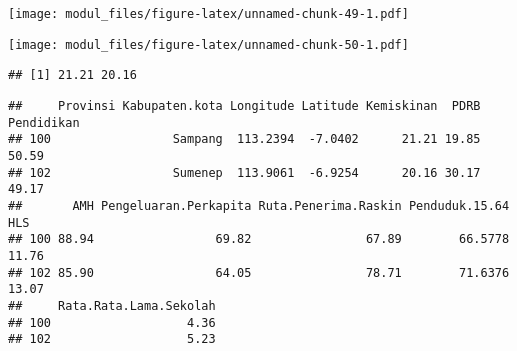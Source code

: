 \documentclass[
]{book}
\newenvironment{Shaded}{\begin{snugshade}}{\end{snugshade}}
\newcommand{\AttributeTok}[1]{\textcolor[rgb]{0.77,0.63,0.00}{#1}}
\newcommand{\DecValTok}[1]{\textcolor[rgb]{0.00,0.00,0.81}{#1}}
\newcommand{\FunctionTok}[1]{\textcolor[rgb]{0.00,0.00,0.00}{#1}}
\newcommand{\NormalTok}[1]{#1}
\newcommand{\OtherTok}[1]{\textcolor[rgb]{0.56,0.35,0.01}{#1}}
\newcommand{\SpecialCharTok}[1]{\textcolor[rgb]{0.00,0.00,0.00}{#1}}
\begin{document}
\begin{Shaded}
\end{Shaded}

\texttt{[image: modul\_files/figure-latex/unnamed-chunk-49-1.pdf]}

\begin{Shaded}
\end{Shaded}

\texttt{[image: modul\_files/figure-latex/unnamed-chunk-50-1.pdf]}

\begin{Shaded}
\end{Shaded}

\begin{verbatim}
## [1] 21.21 20.16
\end{verbatim}

\begin{Shaded}
\end{Shaded}

\begin{verbatim}
##     Provinsi Kabupaten.kota Longitude Latitude Kemiskinan  PDRB Pendidikan
## 100                 Sampang  113.2394  -7.0402      21.21 19.85      50.59
## 102                 Sumenep  113.9061  -6.9254      20.16 30.17      49.17
##       AMH Pengeluaran.Perkapita Ruta.Penerima.Raskin Penduduk.15.64   HLS
## 100 88.94                 69.82                67.89        66.5778 11.76
## 102 85.90                 64.05                78.71        71.6376 13.07
##     Rata.Rata.Lama.Sekolah
## 100                   4.36
## 102                   5.23
\end{verbatim}
\end{document}
